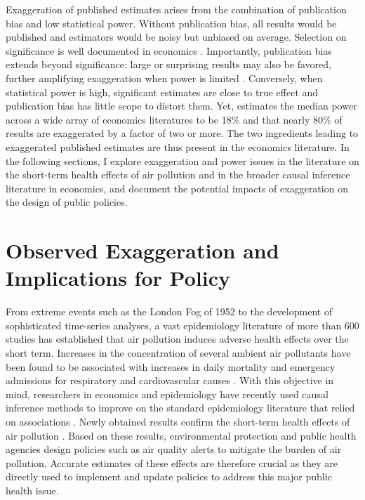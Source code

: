 \documentclass[12pt]{article}
\begin{document}
		Exaggeration of published estimates arises from the combination of publication bias and low statistical power. Without publication bias, all results would be published and estimators would be noisy but unbiased on average. Selection on significance is well documented in economics \citep{rosenthal_file_1979, brodeur_star_2016, andrews_identification_2019, vivalt_specification_2019, abadie_statistical_2020, brodeur_methods_2020}. Importantly, publication bias extends beyond significance: large or surprising results may also be favored, further amplifying exaggeration when power is limited \citep{andrews_inference_2024}. Conversely, when statistical power is high, significant estimates are close to true effect and publication bias has little scope to distort them. Yet, \citet{ioannidis_power_2017} estimates the median power across a wide array of economics literatures to be 18\% and that nearly 80\% of results are exaggerated by a factor of two or more. The two ingredients leading to exaggerated published estimates are thus present in the economics literature. In the following sections, I explore exaggeration and power issues in the literature on the short-term health effects of air pollution and in the broader causal inference literature in economics, and document the potential impacts of exaggeration on the design of public policies.			



\section{Observed Exaggeration and Implications for Policy}\label{section_lit_policy}

	From extreme events such as the London Fog of 1952 to the development of sophisticated time-series analyses, a vast epidemiology literature of more than 600 studies has established that air pollution induces adverse health effects over the short term. Increases in the concentration of several ambient air pollutants have been found to be associated with increases in daily mortality and emergency admissions for respiratory and cardiovascular causes \citep{schwartz_what_1994, samet_national_2000, letertre_shortterm_2002, bell_time-series_2004, liu_ambient_2019}. With this objective in mind, researchers in economics and epidemiology have recently used causal inference methods to improve on the standard epidemiology literature that relied on associations \citep{dominici_best_2017, bind_causal_2019}. Newly obtained results confirm the short-term health effects of air pollution \citep{schwartz_estimating_2015, schwartz_national_2018, deryugina_mortality_2019}. Based on these results, environmental protection and public health agencies design policies such as air quality alerts to mitigate the burden of air pollution. Accurate estimates of these effects are therefore crucial as they are directly used to implement and update policies to address this major public health issue.
	
\end{document}

